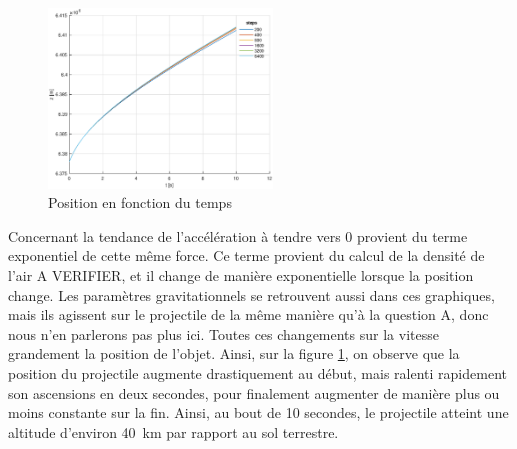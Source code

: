 \documentclass[a4paper,12pt,twoside]{article}
\begin{document}
\begin{figure}[h]
	\centering
	\includegraphics[width=0.53\textwidth]{graphs/zB.eps}
	\caption{Position en fonction du temps}
	\label{fig:B-zt}
\end{figure}

Concernant la tendance de l'accélération à tendre vers 0 provient du terme exponentiel de cette même force. Ce terme provient du calcul de la densité de l'air A VERIFIER, et il change de manière exponentielle lorsque la position change. Les paramètres gravitationnels se retrouvent aussi dans ces graphiques, mais ils agissent sur le projectile de la même manière qu'à la question A, donc nous n'en parlerons pas plus ici.
Toutes ces changements sur la vitesse grandement la position de l'objet. Ainsi, sur la figure \ref{fig:B-zt}, on observe que la position du projectile augmente drastiquement au début, mais ralenti rapidement son ascensions en deux secondes, pour finalement augmenter de manière plus ou moins constante sur la fin. Ainsi, au bout de 10 secondes, le projectile atteint une altitude d'environ \SI{40}{\kilo\meter} par rapport au sol terrestre.\\
\end{document}
